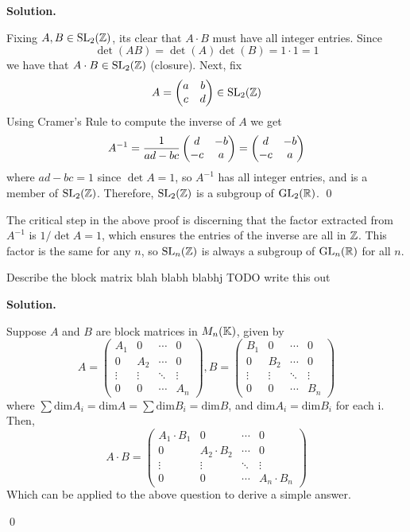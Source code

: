 \documentclass[12pt]{book}
\theoremstyle{definition}
\newenvironment{solution}
{%
  \par\noindent\textbf{Solution.}\quad
}
{%
  \qed\par
}
\begin{document}
\begin{solution}
  Fixing $A, B \in \mathrm{SL}_{2}(\mathbb{Z})$, its clear that $A \cdot B$ must have all integer entries.
  Since
  \[
  \det(AB) = \det(A) \det(B) = 1 \cdot 1 = 1
  \]
  we have that $A \cdot B \in \mathrm{SL}_{2}(\mathbb{Z})$ (closure). 
  Next, fix
  \[
    A = \begin{pmatrix} a & b \\ c & d \end{pmatrix} \in \mathrm{SL}_{2}(\mathbb{Z})
  \]
  Using Cramer's Rule to compute the inverse of $A$ we get 
  \[
  A^{-1} = \frac{1}{ad-bc}\begin{pmatrix} d & -b \\ -c & a \end{pmatrix} = \begin{pmatrix} d & -b \\ -c & a \end{pmatrix} 
  \]
  where $ad-bc = 1$ since $\det A = 1$, so $A^{-1}$ has all integer entries, and is a member of $\mathrm{SL}_{2}(\mathbb{Z})$.
  Therefore, $\mathrm{SL}_{2}(\mathbb{Z})$ is a subgroup of $\mathrm{GL}_{2}(\mathbb{R})$.
\end{solution}

The critical step in the above proof is discerning that the factor extracted from $A^{-1}$ is $1/\det A = 1$, which ensures the entries of the inverse are all in $\mathbb{Z}$.
This factor is the same for any $n$, so $\mathrm{SL}_{n}(\mathbb{Z})$ is always a subgroup of $\mathrm{GL}_{n}(\mathbb{R})$ for all $n$.


\begin{taggedexercise}[Complete]
  Describe the block matrix blah blabh blabhj TODO write this out
\end{taggedexercise}
\begin{solution}
  Suppose $A$ and $B$ are block matrices in $M_n(\mathbb{K})$, given by
  \[
A = \begin{pmatrix}
A_1 & 0   & \cdots & 0 \\
0   & A_2 & \cdots & 0 \\
\vdots & \vdots & \ddots & \vdots \\
0   & 0   & \cdots & A_n
\end{pmatrix},
B = \begin{pmatrix}
  B_1 & 0   & \cdots & 0 \\
  0   & B_2 & \cdots & 0 \\
  \vdots & \vdots & \ddots & \vdots \\
  0   & 0   & \cdots & B_n
  \end{pmatrix}
\]
where $\sum \text{dim}A_i = \text{dim}A = \sum \text{dim}B_i = \text{dim}B$, and $\text{dim} A_i = \text{dim}B_i$ for each i.
Then,
\[
  A \cdot B = \begin{pmatrix}
    A_1\cdot B_1 & 0   & \cdots & 0 \\
    0   & A_2 \cdot B_2 & \cdots & 0 \\
    \vdots & \vdots & \ddots & \vdots \\
    0   & 0   & \cdots & A_n \cdot B_n
    \end{pmatrix}
\]
Which can be applied to the above question to derive a simple answer.

\end{solution}
\end{document}
